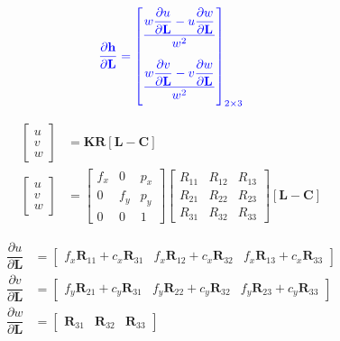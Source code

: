 \documentclass{article}
\renewcommand{\Vec}[1]{{\mathbf{#1}}}
\newcommand{\Mat}[1]{{\mathbf{#1}}}
\newcommand{\camRot}{{\Vec{R}}}
\newcommand{\camPos}{{\Vec{C}}}
\newcommand{\landmarkPos}{{\Vec{L}}}
\newcommand{\projFunc}{{\Vec{h}}}
\begin{document}
\begin{align}
  \color{blue}
  \dfrac{\partial{\projFunc}}{\partial{\landmarkPos}} =
  \begin{bmatrix}
    \dfrac{
      w \dfrac{\partial{u}}{\partial{\landmarkPos}} -
      u \dfrac{\partial{w}}{\partial{\landmarkPos}}
    }{w^{2}} \vspace{1.0em} \\
    \dfrac{
      w \dfrac{\partial{v}}{\partial{\landmarkPos}} -
      v \dfrac{\partial{w}}{\partial{\landmarkPos}}
    }{w^{2}} \vspace{0.5em}
  \end{bmatrix}_{2 \times 3}
\end{align}

\begin{align}
  \begin{bmatrix} u \\ v \\ w \end{bmatrix}
    &= \Mat{K} \camRot [\landmarkPos - \camPos] 
    \nonumber \\
  \begin{bmatrix} u \\ v \\ w \end{bmatrix}
  &= \begin{bmatrix}
      f_x & 0 & p_x \\
      0 & f_y & p_y \\
      0 & 0 & 1
  \end{bmatrix}
  \begin{bmatrix}
      R_{11} & R_{12} & R_{13} \\
      R_{21} & R_{22} & R_{23} \\
      R_{31} & R_{32} & R_{33}
  \end{bmatrix}
  [\landmarkPos - \camPos] 
  \nonumber
\end{align}

\begin{align}
  \dfrac{\partial{u}}{\partial{\landmarkPos}} &=
    \begin{bmatrix}
      f_{x} \camRot_{11} + c_{x} \camRot_{31} &
      f_{x} \camRot_{12} + c_{x} \camRot_{32} &
      f_{x} \camRot_{13} + c_{x} \camRot_{33}
    \end{bmatrix} \\
  \dfrac{\partial{v}}{\partial{\landmarkPos}} &=
    \begin{bmatrix}
      f_{y} \camRot_{21} + c_{y} \camRot_{31} &
      f_{y} \camRot_{22} + c_{y} \camRot_{32} &
      f_{y} \camRot_{23} + c_{y} \camRot_{33}
    \end{bmatrix} \\
  \dfrac{\partial{w}}{\partial{\landmarkPos}} &=
    \begin{bmatrix}
      \camRot_{31} &
      \camRot_{32} &
      \camRot_{33}
    \end{bmatrix}
\end{align}
\end{document}
